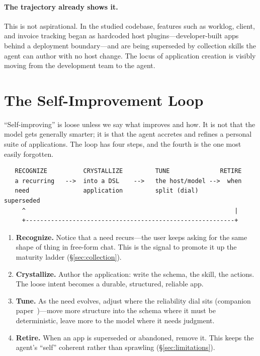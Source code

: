 \documentclass[11pt]{article}
\begin{document}
\paragraph{The trajectory already shows it.}
This is not aspirational. In the studied codebase, features such as worklog, client,
and invoice tracking began as hardcoded host plugins---developer-built apps behind a
deployment boundary---and are being superseded by collection skills the agent can
author with no host change. The locus of application creation is visibly moving from
the development team to the agent.

\section{The Self-Improvement Loop}
\label{sec:loop}

``Self-improving'' is loose unless we say what improves and how. It is not that the
model gets generally smarter; it is that the agent accretes and refines a personal
suite of applications. The loop has four steps, and the fourth is the one most
easily forgotten.

\begin{lstlisting}
   RECOGNIZE          CRYSTALLIZE         TUNE              RETIRE
   a recurring   -->  into a DSL    -->   the host/model -->  when
   need               application         split (dial)        superseded
     ^                                                          |
     +----------------------------------------------------------+
\end{lstlisting}

\begin{enumerate}
  \item \textbf{Recognize.} Notice that a need recurs---the user keeps asking for the
  same shape of thing in free-form chat. This is the signal to promote it up the
  maturity ladder (\S\ref{sec:collection}).
  \item \textbf{Crystallize.} Author the application: write the schema, the skill,
  the actions. The loose intent becomes a durable, structured, reliable app.
  \item \textbf{Tune.} As the need evolves, adjust where the reliability dial sits
  (companion paper~\citep{nakajima2026dsl})---move more structure into the schema
  where it must be deterministic, leave more to the model where it needs judgment.
  \item \textbf{Retire.} When an app is superseded or abandoned, remove it. This
  keeps the agent's ``self'' coherent rather than sprawling (\S\ref{sec:limitations}).
\end{enumerate}
\end{document}
